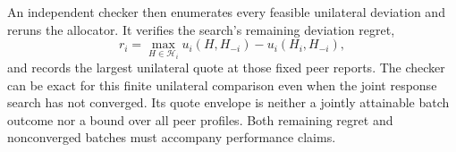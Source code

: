 An independent checker then enumerates every feasible unilateral deviation
and reruns the allocator. It verifies the search's remaining deviation regret,
\begin{equation*}
r_i=\max_{H\in\mathcal H_i}u_i(H,H_{-i})-u_i(H_i,H_{-i}),
\end{equation*}
and records the largest unilateral quote at those fixed peer reports.
The checker can be exact for this finite unilateral comparison even when the
joint response search has not converged. Its quote envelope is neither a
jointly attainable batch outcome nor a bound over all peer profiles. Both
remaining regret and nonconverged batches must accompany performance claims.
